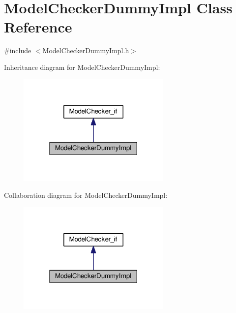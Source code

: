 \hypertarget{class_model_checker_dummy_impl}{}\section{Model\+Checker\+Dummy\+Impl Class Reference}
\label{class_model_checker_dummy_impl}


{\ttfamily \#include $<$Model\+Checker\+Dummy\+Impl.\+h$>$}



Inheritance diagram for Model\+Checker\+Dummy\+Impl\+:\nopagebreak
\begin{figure}[H]
\begin{center}
\leavevmode
\includegraphics[width=213pt]{class_model_checker_dummy_impl__inherit__graph}
\end{center}
\end{figure}


Collaboration diagram for Model\+Checker\+Dummy\+Impl\+:\nopagebreak
\begin{figure}[H]
\begin{center}
\leavevmode
\includegraphics[width=213pt]{class_model_checker_dummy_impl__coll__graph}
\end{center}
\end{figure}
